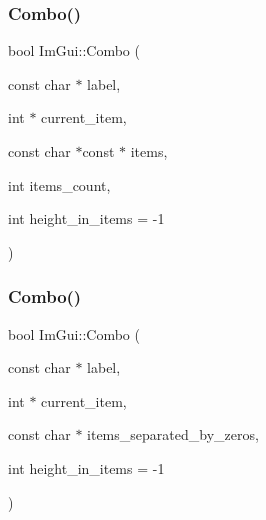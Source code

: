 \hypertarget{namespace_im_gui_ae801624ec02dac3b2b03321fffd91f1a}{}\label{namespace_im_gui_ae801624ec02dac3b2b03321fffd91f1a} 
\subsubsection{\texorpdfstring{Combo()}{Combo()}\hspace{0.1cm}{\footnotesize\ttfamily [1/3]}}
{\footnotesize\ttfamily bool Im\+Gui\+::\+Combo (\begin{DoxyParamCaption}\item[{const char $\ast$}]{label,  }\item[{int $\ast$}]{current\+\_\+item,  }\item[{const char $\ast$const $\ast$}]{items,  }\item[{int}]{items\+\_\+count,  }\item[{int}]{height\+\_\+in\+\_\+items = {\ttfamily -\/1} }\end{DoxyParamCaption})}

\hypertarget{namespace_im_gui_ae80520312b19a7039b77d2bafcbda8e5}{}\label{namespace_im_gui_ae80520312b19a7039b77d2bafcbda8e5} 
\subsubsection{\texorpdfstring{Combo()}{Combo()}\hspace{0.1cm}{\footnotesize\ttfamily [2/3]}}
{\footnotesize\ttfamily bool Im\+Gui\+::\+Combo (\begin{DoxyParamCaption}\item[{const char $\ast$}]{label,  }\item[{int $\ast$}]{current\+\_\+item,  }\item[{const char $\ast$}]{items\+\_\+separated\+\_\+by\+\_\+zeros,  }\item[{int}]{height\+\_\+in\+\_\+items = {\ttfamily -\/1} }\end{DoxyParamCaption})}

\hypertarget{namespace_im_gui_a65d00f64f98ccb810bdb75721612948c}{}\label{namespace_im_gui_a65d00f64f98ccb810bdb75721612948c} 

